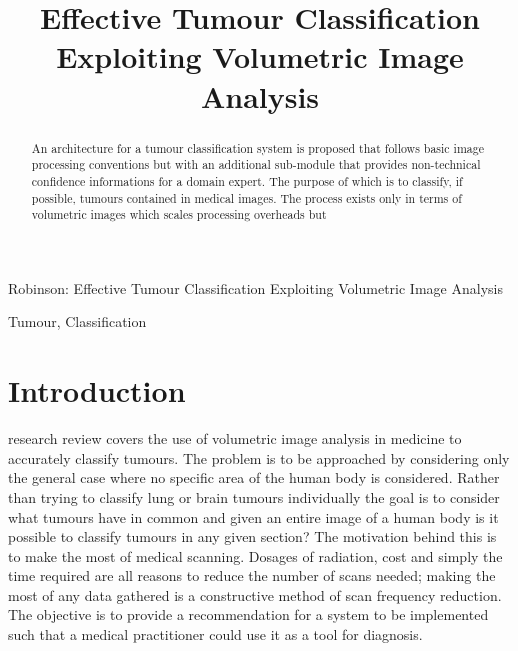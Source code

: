 \documentclass[journal]{IEEEtran}
\begin{document}
\title{Effective Tumour Classification Exploiting Volumetric Image Analysis}
\author{
}


%
{Robinson: Effective Tumour Classification Exploiting Volumetric Image Analysis}

\maketitle


\begin{abstract}

An architecture for a tumour classification system is proposed that follows basic image processing conventions but with an additional sub-module that provides non-technical confidence informations for a domain expert.  
The purpose of which is to classify, if possible, tumours contained in medical images.
The process exists only in terms of volumetric images which scales processing overheads but 

\end{abstract}







\begin{IEEEkeywords}
Tumour, Classification
\end{IEEEkeywords}



\IEEEpeerreviewmaketitle







\section{Introduction}
 research review covers the use of volumetric image analysis in medicine to accurately classify tumours. 
The problem is to be approached by considering only the general case where no specific area of the human body is considered.
Rather than trying to classify lung or brain tumours individually the goal is to consider what tumours have in common and given an entire image of a human body is it possible to classify tumours in any given section?
The motivation behind this is to make the most of medical scanning.
Dosages of radiation, cost and simply the time required are all reasons to reduce the number of scans needed; making the most of any data gathered is a constructive method of scan frequency reduction.
The objective is to provide a recommendation for a system to be implemented such that a medical practitioner could use it as a tool for diagnosis.  
\end{document}
